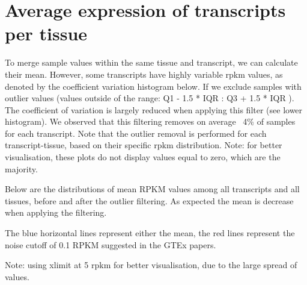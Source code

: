 \documentclass{article}\usepackage[]{graphicx}\usepackage[]{color}
\begin{document}
\section{Average expression of transcripts per tissue}

To merge sample values within the same tissue and transcript, we can calculate their mean. However, some transcripts have highly variable rpkm values, as denoted by the coefficient variation histogram below. If we exclude samples with outlier values (values outside of the range: Q1 - 1.5 * IQR : Q3 + 1.5 * IQR ). The coefficient of variation is largely reduced when applying this filter (see lower histogram). We observed that this filtering removes on average ~4\% of samples for each transcript. Note that the outlier removal is performed for each transcript-tissue, based on their specific rpkm distribution. Note: for better visualisation, these plots do not display values equal to zero, which are the majority. \par
Below are the distributions of mean RPKM values among all transcripts and all tissues, before and after the outlier filtering. As expected the mean is decrease when applying the filtering.\par 
The blue horizontal lines represent either the mean, the red lines represent the noise cutoff of 0.1 RPKM suggested in the GTEx papers.\par
Note: using xlimit at 5 rpkm for better visualisation, due to the large spread of values.\par
\end{document}
